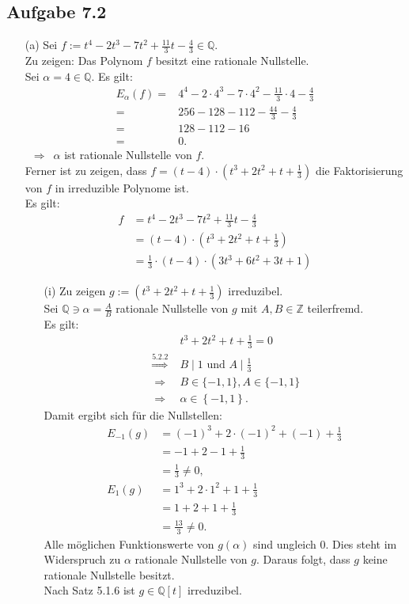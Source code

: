 \documentclass[12pt]{article}
\newcommand{\df}{\enspace\Longrightarrow\enspace}
\begin{document}
\subsection*{Aufgabe 7.2}
\begin{enumerate}
	\item[(a)] Sei $f:=t^4-2t^3-7t^2+\frac{11}{3}t-\frac{4}{3}\in\mathbb{Q}$. \\
	Zu zeigen: Das Polynom $f$ besitzt eine rationale Nullstelle. \\
	Sei $\alpha=4\in\mathbb{Q}$. Es gilt:
	\begin{align*}
		E_\alpha(f)=&4^4-2\cdot4^3-7\cdot4^2-\frac{11}{3}\cdot4-\frac{4}{3} \\
		=&256-128-112-\frac{44}{3}-\frac{4}{3} \\
		=&128-112-16 \\
		=&0.
	\end{align*}
	$\df \alpha$ ist rationale Nullstelle von $f$. \\
	Ferner ist zu zeigen, dass $f=\left(t-4\right)\cdot\left(t^3+2t^2+t+\frac{1}{3}\right)$ die Faktorisierung von $f$ in irreduzible Polynome ist. \\
	Es gilt:
	\begin{align*}
		f&=t^4-2t^3-7t^2+\frac{11}{3}t-\frac{4}{3} \\
		&=\left(t-4\right)\cdot\left(t^3+2t^2+t+\frac{1}{3}\right) \\
		&=\frac{1}{3}\cdot\left(t-4\right)\cdot\left(3t^3+6t^2+3t+1\right)
	\end{align*}
	\begin{enumerate}
		\item[(i)] Zu zeigen $g:=\left(t^3+2t^2+t+\frac{1}{3}\right)$ irreduzibel. \\
		Sei $\mathbb{Q}\ni\alpha=\frac{A}{B}$ rationale Nullstelle von $g$ mit $A,B\in\mathbb{Z}$ teilerfremd.\\
		Es gilt:
		\begin{align*}
			& t^3+2t^2+t+\frac{1}{3}=0 \\
			\overset{5.2.2}{\df} &B\mid1\text{ und }A\mid\frac{1}{3} \\
			\df &B\in\{-1,1\},A\in\{-1,1\} \\
			\df &\alpha\in\left\{-1,1\right\}.
		\end{align*}
		Damit ergibt sich für die Nullstellen:
		\begin{align*}
			E_{-1}(g)&=(-1)^3+2\cdot(-1)^2+(-1)+\frac{1}{3} \\
			&=-1+2-1+\frac{1}{3} \\
			&=\frac{1}{3}\neq0, \\
			E_{1}(g)&=1^3+2\cdot1^2+1+\frac{1}{3} \\
			&=1+2+1+\frac{1}{3} \\
			&=\frac{13}{3}\neq0.
		\end{align*}
		Alle möglichen Funktionswerte von $g(\alpha)$ sind ungleich $0$. Dies steht im Widerspruch zu $\alpha$ rationale Nullstelle von $g$. Daraus folgt, dass $g$ keine rationale Nullstelle besitzt. \\
		Nach Satz 5.1.6 ist $g\in\mathbb{Q}[t]$ irreduzibel.
		

\end{enumerate}
\end{enumerate}
\end{document}
